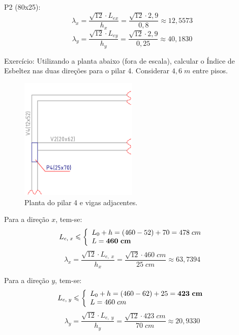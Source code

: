 P2 (80x25):
$$\lambda_x=\frac{\sqrt{12}\cdot L_{ex}}{h_x}=\frac{\sqrt{12}\cdot2,9}{0,8}\approx12,5573$$
$$\lambda_y=\frac{\sqrt{12}\cdot L_{ey}}{h_y}=\frac{\sqrt{12}\cdot2,9}{0,25}\approx40,1830$$

Exercício: Utilizando a planta abaixo (fora de escala), calcular o Índice de Esbeltez nas duas direções para o pilar 4. Considerar $4,6\;m$ entre pisos.

\begin{figure}[H]
	\begin{center}
	\caption{Planta do pilar 4 e vigas adjacentes.}
    	\includegraphics[width=0.5\textwidth]{Indice-de-esbeltez/Imagens/Exercicio-Indice-de-Esbeltez.png}
	\end{center}
\end{figure}

 Para a direção $x$, tem-se:
$$
	L_{e,\;x}\leqslant\left\{
		\begin{array}{ll}
		L_0+h=(460-52)+70=478\;cm \\
		L=\textbf{460\;cm}
		\end{array}\right.
$$
$$\lambda_x=\frac{\sqrt{12}\cdot L_{e,\;x}}{h_x}=\frac{\sqrt{12}\cdot 460\;cm}{25\;cm}\approx63,7394$$

Para a direção $y$, tem-se:
$$
	L_{e,\;y}\leqslant\left\{
		\begin{array}{ll}
		L_0+h=(460-62)+25=\textbf{423\;cm} \\
		L=460\;cm
		\end{array}\right.
$$
$$\lambda_y=\frac{\sqrt{12}\cdot L_{e,\;y}}{h_y}=\frac{\sqrt{12}\cdot 423\;cm}{70\;cm}\approx20,9330$$